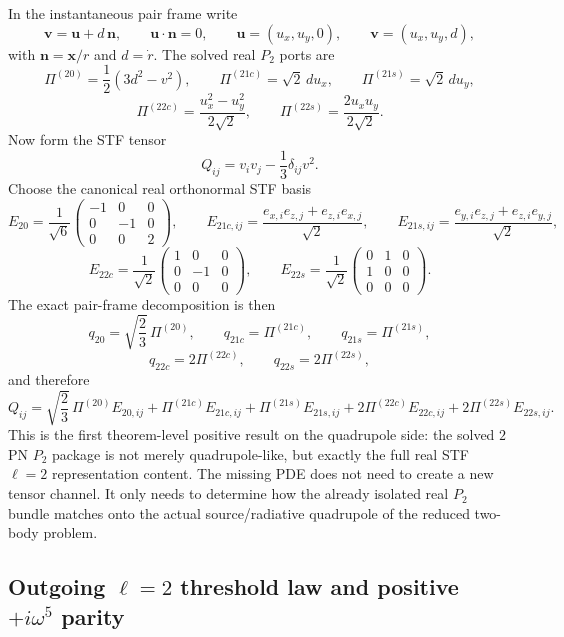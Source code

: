 \documentclass[11pt]{article}
\begin{document}
In the instantaneous pair frame write
\[
\mathbf v=\mathbf u+d\,\mathbf n,
\qquad
\mathbf u\cdot\mathbf n=0,
\qquad
\mathbf u=(u_x,u_y,0),
\qquad
\mathbf v=(u_x,u_y,d),
\]
with $\mathbf n=\mathbf x/r$ and $d=\dot r$.  The solved real $P_2$ ports are
\[
\Pi^{(20)}=\frac12(3d^2-v^2),
\qquad
\Pi^{(21c)}=\sqrt2\,d u_x,
\qquad
\Pi^{(21s)}=\sqrt2\,d u_y,
\]
\[
\Pi^{(22c)}=\frac{u_x^2-u_y^2}{2\sqrt2},
\qquad
\Pi^{(22s)}=\frac{2u_xu_y}{2\sqrt2}.
\]
Now form the STF tensor
\[
Q_{ij}=v_i v_j-\frac13\delta_{ij}v^2.
\]
Choose the canonical real orthonormal STF basis
\[
E_{20}=\frac{1}{\sqrt6}
\begin{pmatrix}
-1&0&0\\
0&-1&0\\
0&0&2
\end{pmatrix},
\qquad
E_{21c,ij}=\frac{e_{x,i}e_{z,j}+e_{z,i}e_{x,j}}{\sqrt2},
\qquad
E_{21s,ij}=\frac{e_{y,i}e_{z,j}+e_{z,i}e_{y,j}}{\sqrt2},
\]
\[
E_{22c}=\frac{1}{\sqrt2}
\begin{pmatrix}
1&0&0\\
0&-1&0\\
0&0&0
\end{pmatrix},
\qquad
E_{22s}=\frac{1}{\sqrt2}
\begin{pmatrix}
0&1&0\\
1&0&0\\
0&0&0
\end{pmatrix}.
\]
The exact pair-frame decomposition is then
\[
q_{20}=\sqrt{\frac23}\,\Pi^{(20)},
\qquad
q_{21c}=\Pi^{(21c)},
\qquad
q_{21s}=\Pi^{(21s)},
\]
\[
q_{22c}=2\Pi^{(22c)},
\qquad
q_{22s}=2\Pi^{(22s)},
\]
and therefore
\[
Q_{ij}
=
\sqrt{\frac23}\,\Pi^{(20)}E_{20,ij}
+\Pi^{(21c)}E_{21c,ij}
+\Pi^{(21s)}E_{21s,ij}
+2\Pi^{(22c)}E_{22c,ij}
+2\Pi^{(22s)}E_{22s,ij}.
\]
This is the first theorem-level positive result on the quadrupole side: the
solved $2$PN $P_2$ package is not merely quadrupole-like, but exactly the full
real STF $\ell=2$ representation content.  The missing PDE does not need to
create a new tensor channel.  It only needs to determine how the already
isolated real $P_2$ bundle matches onto the actual source/radiative quadrupole
of the reduced two-body problem.

\subsection{Outgoing \texorpdfstring{$\ell=2$}{ell=2} threshold law and positive \texorpdfstring{$+i\omega^5$}{+iomega\string^5} parity}
\label{app:quad-ledger-outgoing}
\end{document}
